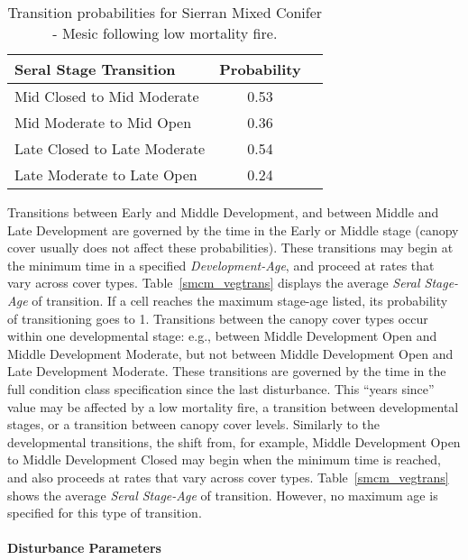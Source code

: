\begin{table}[!htbp]
\small
\centering
\caption{Transition probabilities for Sierran Mixed Conifer - Mesic following low mortality fire.}
\label{smcm_firetrans}
\begin{tabular}{lcc}
\hline
\textbf{Seral Stage Transition} & \textbf{Probability}\\
\hline
Mid Closed to Mid Moderate     	& 0.53   	\\
Mid Moderate to Mid Open    	& 0.36		\\
Late Closed to Late Moderate	& 0.54    \\
Late Moderate to Late Open     	& 0.24    \\
\hline
\end{tabular}
\end{table}

Transitions between Early and Middle Development, and between Middle and Late Development are governed by the time in the Early or Middle stage (canopy cover usually does not affect these probabilities). These transitions may begin at the minimum time in a specified \emph{Development-Age}, and proceed at rates that vary across cover types. Table~\ref{smcm_vegtrans} displays the average \emph{Seral Stage-Age} of transition. If a cell reaches the maximum stage-age listed, its probability of transitioning goes to 1. Transitions between the canopy cover types occur within one developmental stage: e.g., between Middle Development Open and Middle Development Moderate, but not between Middle Development Open and Late Development Moderate. These transitions are governed by the time in the full condition class specification since the last disturbance. This ``years since'' value may be affected by a low mortality fire, a transition between developmental stages, or a transition between canopy cover levels. Similarly to the developmental transitions, the shift from, for example, Middle Development Open to Middle Development Closed may begin when the minimum time is reached, and also proceeds at rates that vary across cover types. Table~\ref{smcm_vegtrans} shows the average \emph{Seral Stage-Age} of transition. However, no maximum age is specified for this type of transition.

\paragraph{Disturbance Parameters} 
\label{subsubsec:distparams}


